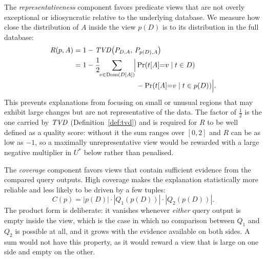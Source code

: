 The \emph{representativeness} component favors predicate views that are not overly exceptional or idiosyncratic relative to the underlying database.
We measure how close the distribution of $A$ inside the view $p(D)$ is to its distribution in the full database:
\begin{align}
R(p,A)
&= 1-\TVD\!\left(P_{D,A},\,P_{p(D),A}\right)\\
&= 1-\frac{1}{2}\!\!\sum_{v \in \Dom(D[A])}\!\!
\Big| \Pr(t[A]{=}v \mid t \in D) \nonumber\\[-2pt]
&\hphantom{{}= 1-\frac{1}{2}\!\!\sum_{v \in \Dom(D[A])}\!\!\Big|}
- \Pr(t[A]{=}v \mid t \in p(D)) \Big|.
\label{eq:ideal-representativeness}
\end{align}
This prevents explanations from focusing on small or unusual regions that may exhibit large changes but are not representative of the data.
The factor of $\frac{1}{2}$ is the one carried by $\mathit{TVD}$ (Definition~\ref{def:tvd}) and is required for $R$ to be well defined as a quality score: without it the sum ranges over $[0,2]$ and $R$ can be as low as $-1$, so a maximally unrepresentative view would be rewarded with a large negative multiplier in $U^*$ below rather than penalised.

The \emph{coverage} component favors views that contain sufficient evidence from the compared query outputs.
High coverage makes the explanation statistically more reliable and less likely to be driven by a few tuples:
\[
C(p)
=
|p(D)| \cdot |Q_1(p(D))| \cdot |Q_2(p(D))|.
\]
The product form is deliberate: it vanishes whenever \emph{either} query output is empty inside the view, which is the case in which no comparison between $Q_1$ and $Q_2$ is possible at all, and it grows with the evidence available on both sides.
A sum would not have this property, as it would reward a view that is large on one side and empty on the other.


